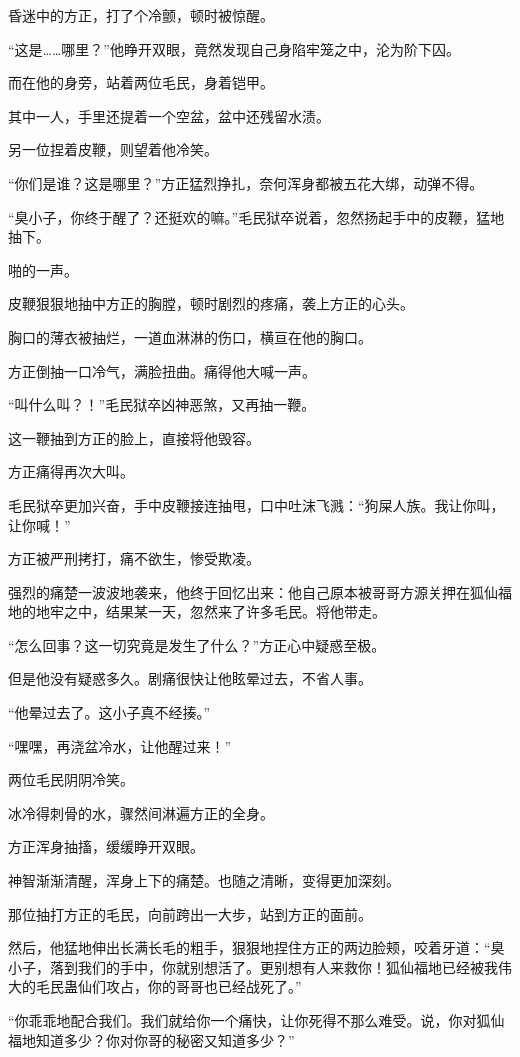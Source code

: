 \begin{this_body}
昏迷中的方正，打了个冷颤，顿时被惊醒。

“这是……哪里？”他睁开双眼，竟然发现自己身陷牢笼之中，沦为阶下囚。

而在他的身旁，站着两位毛民，身着铠甲。

其中一人，手里还提着一个空盆，盆中还残留水渍。

另一位捏着皮鞭，则望着他冷笑。

“你们是谁？这是哪里？”方正猛烈挣扎，奈何浑身都被五花大绑，动弹不得。

“臭小子，你终于醒了？还挺欢的嘛。”毛民狱卒说着，忽然扬起手中的皮鞭，猛地抽下。

啪的一声。

皮鞭狠狠地抽中方正的胸膛，顿时剧烈的疼痛，袭上方正的心头。

胸口的薄衣被抽烂，一道血淋淋的伤口，横亘在他的胸口。

方正倒抽一口冷气，满脸扭曲。痛得他大喊一声。

“叫什么叫？！”毛民狱卒凶神恶煞，又再抽一鞭。

这一鞭抽到方正的脸上，直接将他毁容。

方正痛得再次大叫。

毛民狱卒更加兴奋，手中皮鞭接连抽甩，口中吐沫飞溅：“狗屎人族。我让你叫，让你喊！”

方正被严刑拷打，痛不欲生，惨受欺凌。

强烈的痛楚一波波地袭来，他终于回忆出来：他自己原本被哥哥方源关押在狐仙福地的地牢之中，结果某一天，忽然来了许多毛民。将他带走。

“怎么回事？这一切究竟是发生了什么？”方正心中疑惑至极。

但是他没有疑惑多久。剧痛很快让他眩晕过去，不省人事。

“他晕过去了。这小子真不经揍。”

“嘿嘿，再浇盆冷水，让他醒过来！”

两位毛民阴阴冷笑。

冰冷得刺骨的水，骤然间淋遍方正的全身。

方正浑身抽搐，缓缓睁开双眼。

神智渐渐清醒，浑身上下的痛楚。也随之清晰，变得更加深刻。

那位抽打方正的毛民，向前跨出一大步，站到方正的面前。

然后，他猛地伸出长满长毛的粗手，狠狠地捏住方正的两边脸颊，咬着牙道：“臭小子，落到我们的手中，你就别想活了。更别想有人来救你！狐仙福地已经被我伟大的毛民蛊仙们攻占，你的哥哥也已经战死了。”

“你乖乖地配合我们。我们就给你一个痛快，让你死得不那么难受。说，你对狐仙福地知道多少？你对你哥的秘密又知道多少？”


\end{this_body}
